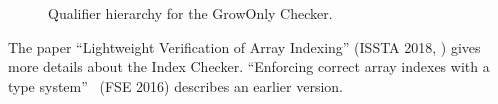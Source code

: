 \begin{figure}
\begin{center}
\end{center}
\caption{Qualifier hierarchy for the GrowOnly Checker.}
\label{growonly-mutability-lattice}
\end{figure}


The paper ``Lightweight Verification of Array Indexing'' (ISSTA 2018,
)
gives more details about the Index Checker.
``Enforcing correct array indexes with a type system''~\cite{Santino2016} (FSE 2016) describes
an earlier version.

